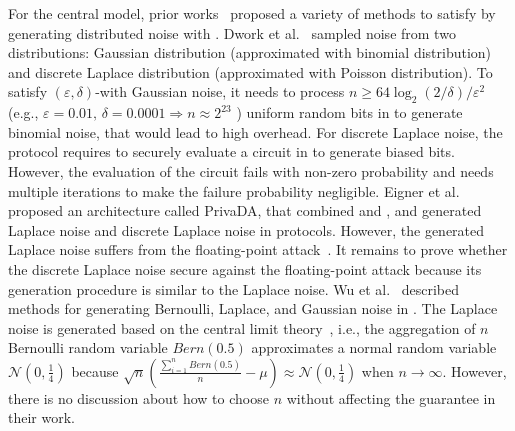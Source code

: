 For the central \differentialprivacy model, prior works~\cite{dwork2006our, eigner2014differentially,wu2016inherit,jayaraman2018distributed,knott2021crypten,yuan2021practical,eriguchi2021efficient} proposed a variety of methods to satisfy \differentialprivacy by generating distributed noise with \smpc.
Dwork et al.~\cite{dwork2006our} sampled noise from two distributions: Gaussian distribution (approximated with binomial distribution) and discrete Laplace distribution (approximated with Poisson distribution).
To satisfy $\left(\varepsilon ,\delta \right) $-\differentialprivacy with Gaussian noise, it needs to process $n\geq 64 \log_2{\left(2/\delta \right) }/\varepsilon ^2$ (e.g., $\varepsilon =0.01 \text{, }\delta=0.0001\Rightarrow n\approx 2^{23}$ ) uniform random bits in \smpc to generate binomial noise, that would lead to high \smpc overhead.
For discrete Laplace noise, the protocol requires to securely evaluate a circuit in \smpc to generate biased bits. However, the evaluation of the circuit fails with non-zero probability and needs multiple iterations to make the failure probability negligible.
Eigner et al.~\cite{eigner2014differentially} proposed an architecture called PrivaDA, that combined \differentialprivacy and \smpc, and generated Laplace noise and discrete Laplace noise in \smpc protocols. However, the generated Laplace noise suffers from the floating-point attack~\cite{mironov2012significance}. It remains to prove whether the discrete Laplace noise secure against the floating-point attack because its generation procedure is similar to the Laplace noise.
Wu et al.~\cite{wu2016inherit} described methods for generating Bernoulli, Laplace, and Gaussian noise in \smpc. The Laplace noise is generated based on the central limit theory~\cite[Example 10.3.2]{athreya2006measure}, i.e., the aggregation of $n$ Bernoulli random variable $Bern\left(0.5\right)$ approximates a normal random variable $\mathcal{N} \left(0,\frac{1}{4}\right)$ because $\sqrt{n}\left(\frac{\sum_{i = 1}^{n}  Bern\left(0.5\right) }{n}-\mu\right) \approx \mathcal{N} \left(0,\frac{1}{4}\right)   $ when $n \rightarrow \infty $. However, there is no discussion about how to choose $n$ without affecting the \differentialprivacy guarantee in their work.

